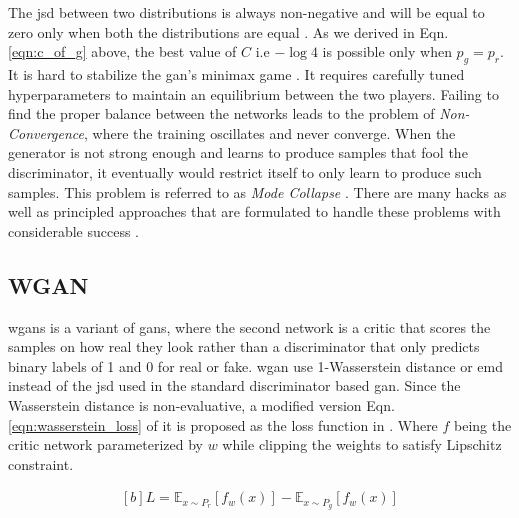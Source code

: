 The \ac{jsd} between two distributions is always non-negative and will be equal to zero only when both the distributions are equal \cite{js_divergence}. As we derived in Eqn. \ref{eqn:c_of_g} above, the best value of $C$ i.e $-\log 4$ is possible only when $p_{g}=p_{r}$. It is hard to stabilize the \ac{gan}'s minimax game \cite{martin2017principled}. It requires carefully tuned hyperparameters to maintain an equilibrium between the two players. Failing to find the proper balance between the networks leads to the problem of \textit{Non-Convergence}, where the training oscillates and never converge. When the generator is not strong enough and learns to produce samples that fool the discriminator, it eventually would restrict itself to only learn to produce such samples. This problem is referred to as \textit{Mode Collapse} \cite{commonganprobs}. There are many hacks as well as principled approaches that are formulated to handle these problems with considerable success \cite{openaigan2wgan}.

\subsection{WGAN}
\acp{wgan} is a variant of \acp{gan}, where the second network is a critic that scores the samples on how real they look rather than a discriminator that only predicts binary labels of 1 and 0 for real or fake. \ac{wgan} use 1-Wasserstein distance \cite{wasserstein_metric_2020} or \ac{emd} instead of the \ac{jsd} used in the standard discriminator based \ac{gan}. Since the Wasserstein distance is non-evaluative, a modified version Eqn. \ref{eqn:wasserstein_loss} of it is proposed as the loss function in \cite{soumith2017wasserstein}. Where $f$ being the critic network parameterized by $w$ while clipping the weights to satisfy Lipschitz constraint.

\begin{equation} \label{eqn:wasserstein_loss}
    \begin{aligned}[b]
        L=\mathbb{E}_{x \sim P_{r}}\left[f_{w}(x)\right]-\mathbb{E}_{x \sim P_{g}}\left[f_{w}(x)\right]
    \end{aligned}
\end{equation}



